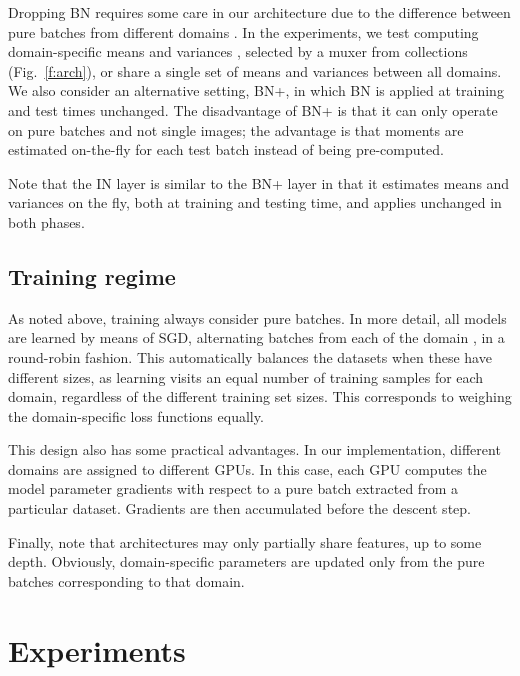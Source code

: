 \documentclass[10pt,twocolumn,letterpaper]{article}
\begin{document}
Dropping BN requires some care in our architecture due to the difference between pure batches from different domains . In the experiments, we test computing domain-specific means and variances , selected by a muxer from collections  (Fig.~\ref{f:arch}), or share a single set of means and variances  between all domains. We also consider an alternative setting, BN+, in which BN is applied at training and test times unchanged. The disadvantage of BN+ is that it can only operate on pure batches and not single images; the advantage is that moments are estimated on-the-fly for each test batch instead of being pre-computed.

Note that the IN layer is similar to the BN+ layer in that it estimates means and variances on the fly, both at training and testing time, and applies unchanged in both phases.

\subsection{Training regime}\label{s:regime}


As noted above, training always consider pure batches. In more detail, all models are learned by means of SGD, alternating batches from each of the domain , in a round-robin fashion. This automatically balances the datasets when these have different sizes, as learning visits an equal number of training samples for each domain, regardless of the different training set sizes. This corresponds to weighing the domain-specific loss functions equally.

This design also has some practical advantages. In our implementation, different domains are assigned to different GPUs. In this case, each GPU computes the model parameter gradients with respect to a pure batch extracted from a particular dataset. Gradients are then accumulated before the descent step.

Finally, note that architectures may only partially share features, up to some depth. Obviously, domain-specific parameters are updated only from the pure batches corresponding to that domain.

\section{Experiments}\label{s:experiments}
\end{document}
